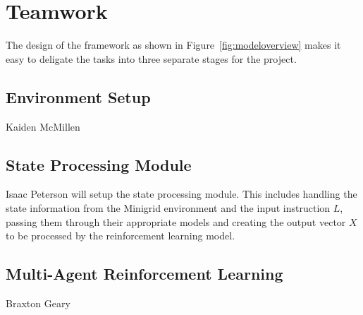\documentclass[11pt]{article}
\begin{document}
\section{Teamwork}

The design of the framework as shown in Figure~\ref{fig:modeloverview} makes it easy to deligate the tasks into three separate stages for the project. 

\subsection{Environment Setup}

Kaiden McMillen

\subsection{State Processing Module}
Isaac Peterson will setup the state processing module. This includes handling the state information from the Minigrid environment and the input instruction $L$, passing them through their appropriate models and creating the output vector $X$ to be processed by the reinforcement learning model. 

\subsection{Multi-Agent Reinforcement Learning}

Braxton Geary




% 


\end{document}
